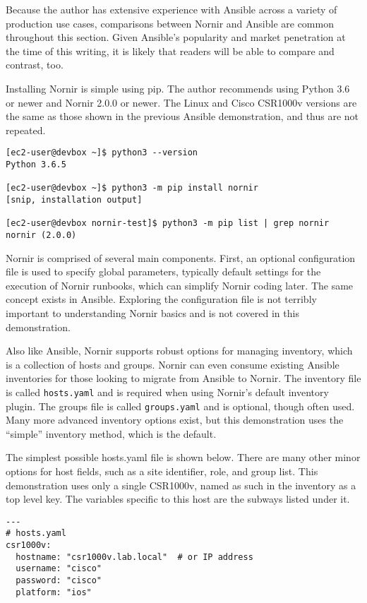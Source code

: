 Because the author has extensive experience with Ansible across a variety of
production use cases, comparisons between Nornir and Ansible are common
throughout this section. Given Ansible's popularity and market penetration at
the time of this writing, it is likely that readers will be able to compare
and contrast, too.

Installing Nornir is simple using pip. The author recommends using Python 3.6
or newer and Nornir 2.0.0 or newer. The Linux and Cisco CSR1000v versions are
the same as those shown in the previous Ansible demonstration, and thus are not repeated.

\begin{verbatim}
[ec2-user@devbox ~]$ python3 --version
Python 3.6.5

[ec2-user@devbox ~]$ python3 -m pip install nornir
[snip, installation output]

[ec2-user@devbox nornir-test]$ python3 -m pip list | grep nornir
nornir (2.0.0)
\end{verbatim}

Nornir is comprised of several main components. First, an optional
configuration file is used to specify global parameters, typically default
settings for the execution of Nornir runbooks, which can simplify Nornir
coding later. The same concept exists in Ansible. Exploring the configuration
file is not terribly important to understanding Nornir basics and is not
covered in this demonstration.

Also like Ansible, Nornir supports robust options for managing inventory,
which is a collection of hosts and groups. Nornir can even consume existing
Ansible inventories for those looking to migrate from Ansible to Nornir. The
inventory file is called \verb|hosts.yaml| and is required when using Nornir's
default inventory plugin. The groups file is called \verb|groups.yaml| and is
optional, though often used. Many more advanced inventory options exist, but
this demonstration uses the ``simple'' inventory method, which is the default.

The simplest possible hosts.yaml file is shown below. There are many other
minor options for host fields, such as a site identifier, role, and group
list. This demonstration uses only a single CSR1000v, named as such in the
inventory as a top level key. The variables specific to this host are the
subways listed under it.

\begin{verbatim}
---
# hosts.yaml
csr1000v:
  hostname: "csr1000v.lab.local"  # or IP address
  username: "cisco"
  password: "cisco"
  platform: "ios"
\end{verbatim}


